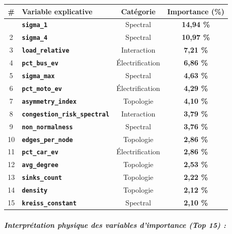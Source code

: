 \documentclass[10pt, a4paper]{article}
\newcounter{none}
\begin{document}
{\def\LTcaptype{none} %
\begin{longtable}[]{@{}clcc@{}}
\toprule\noalign{}
\# & Variable explicative & Catégorie & Importance (\%) \\
\midrule\noalign{}
\endhead
\bottomrule\noalign{}
\endlastfoot
1 & \textbf{\texttt{sigma\_1}} & Spectral & \textbf{14,94 \%} \\
2 & \textbf{\texttt{sigma\_4}} & Spectral & \textbf{10,97 \%} \\
3 & \textbf{\texttt{load\_relative}} & Interaction & \textbf{7,21 \%} \\
4 & \textbf{\texttt{pct\_bus\_ev}} & Électrification & \textbf{6,86
\%} \\
5 & \textbf{\texttt{sigma\_max}} & Spectral & \textbf{4,63 \%} \\
6 & \textbf{\texttt{pct\_moto\_ev}} & Électrification & \textbf{4,29
\%} \\
7 & \textbf{\texttt{asymmetry\_index}} & Topologie & \textbf{4,10 \%} \\
8 & \textbf{\texttt{congestion\_risk\_spectral}} & Interaction &
\textbf{3,79 \%} \\
9 & \textbf{\texttt{non\_normalness}} & Spectral & \textbf{3,76 \%} \\
10 & \textbf{\texttt{edges\_per\_node}} & Topologie & \textbf{2,86
\%} \\
11 & \textbf{\texttt{pct\_car\_ev}} & Électrification & \textbf{2,86
\%} \\
12 & \textbf{\texttt{avg\_degree}} & Topologie & \textbf{2,53 \%} \\
13 & \textbf{\texttt{sinks\_count}} & Topologie & \textbf{2,22 \%} \\
14 & \textbf{\texttt{density}} & Topologie & \textbf{2,12 \%} \\
15 & \textbf{\texttt{kreiss\_constant}} & Spectral & \textbf{2,10 \%} \\
\end{longtable}
}

\subparagraph{Interprétation physique des variables d'importance (Top
15)
:}\label{interpruxe9tation-physique-des-variables-dimportance-top-15}
\end{document}
